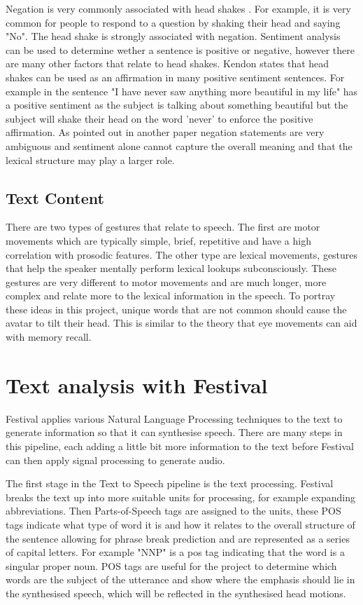 \documentclass[bsc,frontabs,twoside,singlespacing,parskip]{infthesis}
\begin{document}
Negation is very commonly associated with head shakes \cite{head_shaking}. For example, it is very common for people to respond to a question by shaking their head and saying "No". The head shake is strongly associated with negation. Sentiment analysis can be used to determine wether a sentence is positive or negative, however there are many other factors that relate to head shakes. Kendon states that head shakes can be used as an affirmation \cite{kendon} in many positive sentiment sentences. For example in the sentence "I have never saw anything more beautiful in my life" has a positive sentiment as the subject is talking about something beautiful but the subject will shake their head on the word 'never' to enforce the positive affirmation. As pointed out in another paper \cite{negative_sentiment} negation statements are very ambiguous and sentiment alone cannot capture the overall meaning and that the lexical structure may play a larger role.

\subsection{Text Content}

There are two types of gestures that relate to speech. \cite{lexical_gestures} The first are motor movements which are typically simple, brief, repetitive and have a high correlation with prosodic features. The other type are lexical movements, gestures that help the speaker mentally perform lexical lookups subconsciously. These gestures are very different to motor movements and are much longer, more complex and relate more to the lexical information in the speech. To portray these ideas in this project, unique words that are not common should cause the avatar to tilt their head. This is similar to the theory that eye movements can aid with memory recall. \cite{eye_movements}

\section{Text analysis with Festival}

Festival applies various Natural Language Processing techniques to the text to generate information  so that it can synthesise speech.  There are many steps in this pipeline, each adding a little bit more information to the text before Festival can then apply signal processing to generate audio. 

The first stage in the Text to Speech pipeline is the text processing. Festival breaks the text up into more suitable units for processing, for example expanding abbreviations. Then Parts-of-Speech tags are assigned to the units, these POS tags indicate what type of word it is and how it relates to the overall structure of the sentence allowing for phrase break prediction and are represented as a series of capital letters. For example "NNP" is a pos tag indicating that the word is a singular proper noun. POS tags are useful for the project to determine which words are the subject of the utterance and show where the emphasis should lie in the synthesised speech, which will be reflected in the synthesised head motions.
\end{document}
